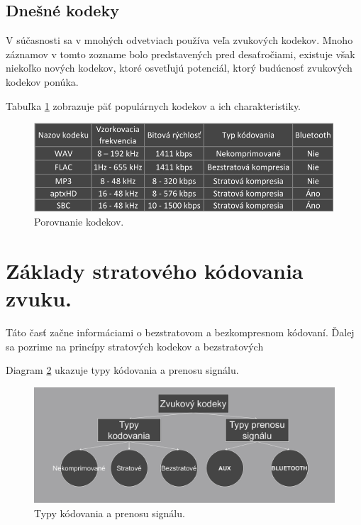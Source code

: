 \documentclass[10pt,twoside,slovak,a4paper]{article}
\begin{document}
\subsection{Dnešné kodeky}  \label{populárne kodeky}  

V súčasnosti sa v mnohých odvetviach používa veľa zvukových kodekov. Mnoho záznamov v tomto zozname bolo predstavených pred desaťročiami, existuje však niekoľko nových kodekov, ktoré osvetľujú potenciál, ktorý budúcnosť zvukových kodekov ponúka. 

Tabuľka \ref{f:rozhod3} zobrazuje päť populárnych kodekov a ich charakteristiky. 
\begin{figure}[tbh]
\centering
\includegraphics[scale=1.0]{porovnanie_kodekov.pdf}
\caption{Porovnanie kodekov.\cite{Logvinov, ValdikSS}}
\label{f:rozhod3}
\end{figure}

\section{Základy stratového kódovania zvuku.} \label{stratové kódovanie}

Táto časť začne informáciami o bezstratovom a bezkompresnom kódovaní. Ďalej sa pozrime na princípy stratových kodekov a bezstratových

Diagram \ref{f:rozhod2} ukazuje typy kódovania a prenosu signálu. 
\begin{figure}[tbh]
\centering
\includegraphics[scale=0.4]{Typy_kodovania_prenosu.pdf}
\caption{Typy kódovania a prenosu signálu.}
\label{f:rozhod2}
\end{figure}
\end{document}
